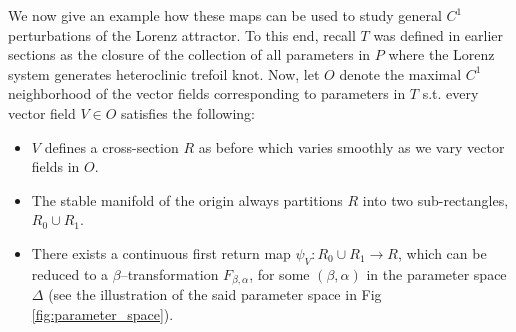 \documentclass[10pt,reqno]{amsart}
\theoremstyle{plain}
\theoremstyle{assumption}
\theoremstyle{notation}
\theoremstyle{claim}
\theoremstyle{conj}
\theoremstyle{theorem}
\theoremstyle{proposition}
\theoremstyle{corollary}
\begin{document}
We now give an example how these maps can be used to study general $C^1$ perturbations of the Lorenz attractor. To this end, recall $T$ was defined in earlier sections as the closure of the collection of all parameters in $P$ where the Lorenz system generates heteroclinic trefoil knot. Now, let $O$ denote the maximal $C^1$ neighborhood of the vector fields corresponding to parameters in $T$ s.t. every vector field $V\in O$ satisfies the following:
\begin{itemize}
    \item $V$ defines a cross-section $R$ as before which varies smoothly as we vary vector fields in $O$.
    \item The stable manifold of the origin always partitions $R$ into two sub-rectangles, $R_0\cup R_1$.
    \item There exists a continuous first return map $\psi_V:R_0\cup R_1\to R$, which can be reduced to a $\beta$--transformation $F_{\beta,\alpha}$, for some $(\beta,\alpha)$ in the parameter space $\Delta$ (see the illustration of the said parameter space in Fig \ref{fig:parameter_space}). 
\end{itemize}
\end{document}
